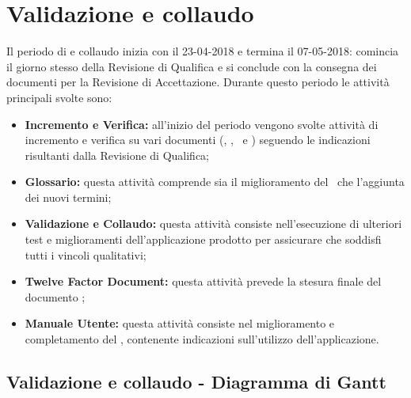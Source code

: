 \documentclass[PianoDiProgetto.tex]{subfiles}
\begin{document}
\section{Validazione e collaudo}
Il periodo di  e collaudo inizia con il 23-04-2018 e termina il 07-05-2018: comincia il giorno stesso della Revisione di Qualifica e si conclude con la consegna dei documenti per la Revisione di Accettazione. Durante questo periodo le attività principali svolte sono:
\begin{itemize}
\item \textbf{Incremento e Verifica:} all’inizio del periodo vengono svolte attività di incremento e verifica su vari documenti (\ndp, \pdp, \pdq\ e \pb) seguendo le indicazioni risultanti dalla Revisione di Qualifica;
\item \textbf{Glossario:} questa attività comprende sia il miglioramento del \g\ che l’aggiunta dei nuovi termini;
\item \textbf{Validazione e Collaudo:} questa attività consiste nell’esecuzione di ulteriori test e miglioramenti dell'applicazione prodotto per assicurare che soddisfi tutti i vincoli qualitativi;
\item \textbf{Twelve Factor Document:} questa attività prevede la stesura finale del documento \tfd;
\item \textbf{Manuale Utente:} questa attività consiste nel miglioramento e completamento del \mut, contenente indicazioni sull’utilizzo dell'applicazione.

\end{itemize}
\begin{landscape}
\subsection{Validazione e collaudo - Diagramma di Gantt}
\end{landscape}	
\end{document}

